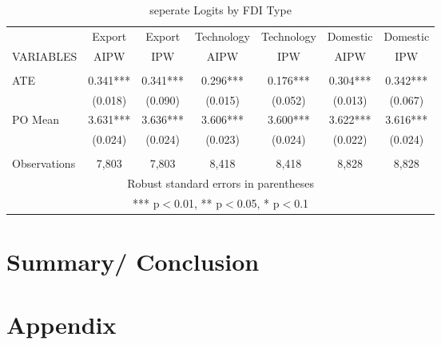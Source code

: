 \documentclass[a4paper,12pt]{scrartcl}
\newcommand{\sectionnumbering}[1]{%
  \setcounter{section}{0}%
   \renewcommand{\thesection}{\csname #1\endcsname{section}}}
\begin{document}
\begin{table}

  \centering
   \caption{seperate Logits by FDI Type} 
  \label{} 
 \begin{tabular}{lcccccc} \hline
 & Export   &Export  & Technology  &Technology  & Domestic  & Domestic  \\
VARIABLES & AIPW & IPW & AIPW & IPW & AIPW & IPW  \\ \hline
 &  &  &  &  &  &  \\
ATE  & 0.341*** & 0.341*** &   0.296*** &   0.176*** &   0.304*** &   0.342***   \\
 & (0.018) & (0.090) & (0.015) &   (0.052) &   (0.013) &   (0.067)   \\
PO Mean &3.631***&   3.636***   & 3.606***   & 3.600***   & 3.622*** &   3.616*** \\
 & (0.024) & (0.024) &   (0.023) &   (0.024) &   (0.022) &   (0.024) \\
 &  &  &  &  &  & \\
 Observations & 7,803  & 7,803&  8,418 & 8,418  &  8,828  & 8,828 \\ \hline
\multicolumn{7}{c}{ Robust standard errors in parentheses} \\
\multicolumn{7}{c}{ *** p$<$0.01, ** p$<$0.05, * p$<$0.1} \\
\end{tabular}
\end{table}




\section{Summary/ Conclusion}




\newpage






\section*{Appendix}
\sectionnumbering{Roman}
\setcounter{page}{3} %
\end{document}
